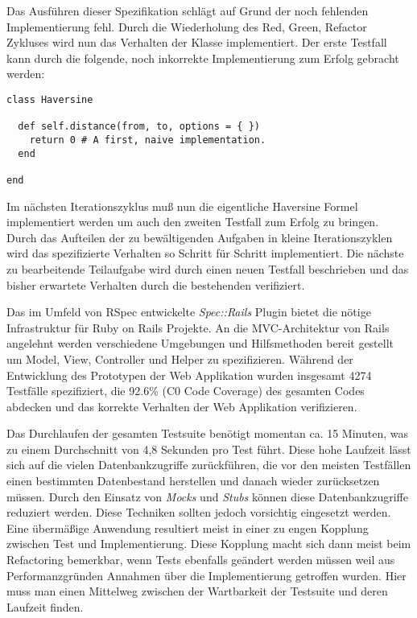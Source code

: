 Das Ausführen dieser Spezifikation schlägt auf Grund der noch
fehlenden Implementierung fehl. Durch die Wiederholung des Red, Green,
Refactor Zykluses wird nun das Verhalten der Klasse implementiert. Der
erste Testfall kann durch die folgende, noch inkorrekte
Implementierung zum Erfolg gebracht werden:

\begin{lstlisting}
class Haversine

  def self.distance(from, to, options = { })
    return 0 # A first, naive implementation.
  end

end
\end{lstlisting}

Im nächsten Iterationszyklus muß nun die eigentliche Haversine Formel
\cite{wiki:haversine} implementiert werden um auch den zweiten
Testfall zum Erfolg zu bringen. Durch das Aufteilen der zu
bewältigenden Aufgaben in kleine Iterationszyklen wird das
spezifizierte Verhalten so Schritt für Schritt implementiert. Die
nächste zu bearbeitende Teilaufgabe wird durch einen neuen Testfall
beschrieben und das bisher erwartete Verhalten durch die bestehenden
verifiziert.

Das im Umfeld von RSpec entwickelte \textit{Spec::Rails} Plugin bietet
die nötige Infrastruktur für Ruby on Rails Projekte. An die
MVC-Architektur von Rails angelehnt werden verschiedene Umgebungen und
Hilfsmethoden bereit gestellt um Model, View, Controller und Helper zu
spezifizieren. Während der Entwicklung des Prototypen der Web
Applikation wurden insgesamt 4274 Testfälle spezifiziert, die 92.6\%
(C0 Code Coverage) des gesamten Codes abdecken und das korrekte
Verhalten der Web Applikation verifizieren.

Das Durchlaufen der gesamten Testsuite benötigt momentan ca. 15
Minuten, was zu einem Durchschnitt von 4,8 Sekunden pro Test
führt. Diese hohe Laufzeit lässt sich auf die vielen Datenbankzugriffe
zurückführen, die vor den meisten Testfällen einen bestimmten
Datenbestand herstellen und danach wieder zurücksetzen müssen. Durch
den Einsatz von \textit{Mocks} und \textit{Stubs} können diese
Datenbankzugriffe reduziert werden. Diese Techniken sollten jedoch
vorsichtig eingesetzt werden. Eine übermäßige Anwendung resultiert
meist in einer zu engen Kopplung zwischen Test und
Implementierung. Diese Kopplung macht sich dann meist beim Refactoring
bemerkbar, wenn Tests ebenfalls geändert werden müssen weil aus
Performanzgründen Annahmen über die Implementierung getroffen
wurden. Hier muss man einen Mittelweg zwischen der Wartbarkeit der
Testsuite und deren Laufzeit finden.


